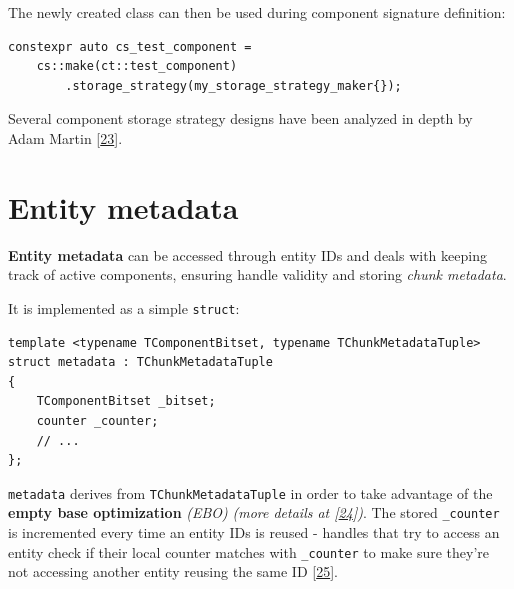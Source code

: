 \documentclass[twoside, 12pt, a4paper, openany]{book}
\begin{document}
The newly created class can then be used during component signature
definition:

\begin{verbatim}
constexpr auto cs_test_component =
    cs::make(ct::test_component)
        .storage_strategy(my_storage_strategy_maker{});
\end{verbatim}

Several component storage strategy designs have been analyzed in depth
by Adam Martin {[}\protect\hyperlink{ref-tmachine_compstorage}{23}{]}.

\hypertarget{storage_entity}{\section{Entity
metadata}\label{storage_entity}}

\textbf{Entity metadata} can be accessed through entity IDs and deals
with keeping track of active components, ensuring handle validity and
storing \emph{chunk metadata}.

It is implemented as a simple
\texttt{struct}:

\begin{verbatim}
template <typename TComponentBitset, typename TChunkMetadataTuple>
struct metadata : TChunkMetadataTuple
{
    TComponentBitset _bitset;
    counter _counter;
    // ...
};
\end{verbatim}

\texttt{metadata}
derives from
\texttt{TChunkMetadataTuple}
in order to take advantage of the \textbf{empty base optimization}
\emph{(EBO)} \emph{(more details at
{[}\protect\hyperlink{ref-cppreference_ebo}{24}{]})}. The stored
\texttt{_counter}
is incremented every time an entity IDs is reused - handles that try to
access an entity check if their local counter matches with
\texttt{_counter}
to make sure they're not accessing another entity reusing the same ID
{[}\protect\hyperlink{ref-tmachine_eids}{25}{]}.
\end{document}
